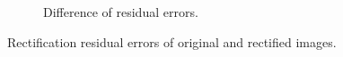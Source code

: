 \begin{figure}[h]
\begin{subfigure}[b]{0.7\textwidth}
    \caption{Difference of residual errors.}
    \label{fig:rect_rdiff}
  \end{subfigure}
  \caption{Rectification residual errors of original and rectified images.}
  \label{fig:rect}
\end{figure}

